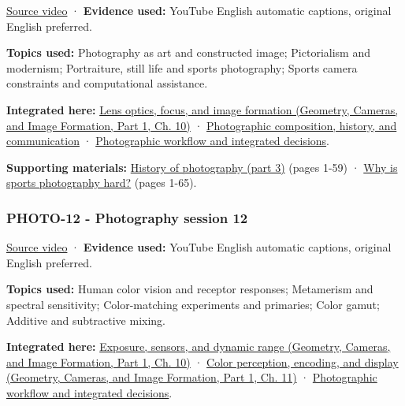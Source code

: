 \hypertarget{04-visual-computing-ii-ch036-photo-11---photography-session-11}{}

\href{https://www.youtube.com/watch?v=AaJz5RMtO4c}{Source video} · \textbf{Evidence used:} YouTube English automatic captions, original English preferred.

\textbf{Topics used:} Photography as art and constructed image; Pictorialism and modernism; Portraiture, still life and sports photography; Sports camera constraints and computational assistance.

\textbf{Integrated here:} \href{../03-Geometry-Cameras-and-Image-Formation-P01/main.pdf\#nameddest=03-visual-computing-i-ch003-lens-optics-focus-and-image-formation}{Lens optics, focus, and image formation (Geometry, Cameras, and Image Formation, Part 1, Ch. 10)} · \hyperref[04-visual-computing-ii-ch034-photographic-composition-history-and-communication]{Photographic composition, history, and communication} · \hyperref[04-visual-computing-ii-ch034-photographic-workflow-and-integrated-decisions]{Photographic workflow and integrated decisions}.

\textbf{Supporting materials:} \href{https://drive.google.com/open?id=0B6w2XfPHEcZYU1hzN1BtalBqQ1U}{History of photography (part 3)} (pages 1-59) · \href{https://drive.google.com/open?id=0B6w2XfPHEcZYc1BpLTNjZGUzbk0}{Why is sports photography hard?} (pages 1-65).

\subsubsection{PHOTO-12 - Photography session 12}\label{04-visual-computing-ii-ch036-photo-12---photography-session-12}

\hypertarget{04-visual-computing-ii-ch036-photo-12---photography-session-12}{}

\href{https://www.youtube.com/watch?v=gRT0mtabjI4}{Source video} · \textbf{Evidence used:} YouTube English automatic captions, original English preferred.

\textbf{Topics used:} Human color vision and receptor responses; Metamerism and spectral sensitivity; Color-matching experiments and primaries; Color gamut; Additive and subtractive mixing.

\textbf{Integrated here:} \href{../03-Geometry-Cameras-and-Image-Formation-P01/main.pdf\#nameddest=03-visual-computing-i-ch003-exposure-sensors-and-dynamic-range}{Exposure, sensors, and dynamic range (Geometry, Cameras, and Image Formation, Part 1, Ch. 10)} · \href{../03-Geometry-Cameras-and-Image-Formation-P01/main.pdf\#nameddest=03-visual-computing-i-ch004-color-perception-encoding-and-display}{Color perception, encoding, and display (Geometry, Cameras, and Image Formation, Part 1, Ch. 11)} · \hyperref[04-visual-computing-ii-ch034-photographic-workflow-and-integrated-decisions]{Photographic workflow and integrated decisions}.

